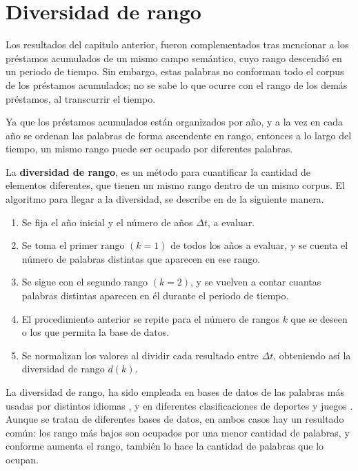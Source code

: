 \chapter{Diversidad de rango}
\label{cap.diversidad}

Los resultados del capitulo anterior, fueron complementados tras mencionar a los préstamos acumulados de un mismo campo semántico, cuyo rango descendió en un periodo de tiempo. Sin embargo, estas palabras no conforman todo el corpus de los préstamos acumulados; no se sabe lo que ocurre con el rango de los demás préstamos, al transcurrir el tiempo. 

Ya que los préstamos acumulados están organizados por año, y a la vez en cada año se ordenan las palabras de forma ascendente en rango, entonces a lo largo del tiempo, un mismo rango puede ser ocupado por diferentes palabras. 

La \textbf{diversidad de rango}, es un método para cuantificar la cantidad de elementos diferentes, que tienen un mismo rango dentro de un mismo corpus. El algoritmo para llegar a la diversidad, se describe en \cite{tesis.sergio} de la siguiente manera.


\begin{enumerate}
		
	\item Se fija el año inicial y el número de años $\Delta t$, a evaluar.
	
	\item Se toma el primer rango $(k=1)$ de todos los años a evaluar, y se cuenta el número de palabras distintas que aparecen en ese rango.  
	
	\item Se sigue con el segundo rango $(k=2)$, y se vuelven a contar cuantas palabras distintas aparecen en él durante el periodo de tiempo. 
	
	\item El procedimiento anterior se repite para el número de rangos $k$ que se deseen o los que permita la base de datos. 
	
	\item Se normalizan los valores al dividir cada resultado entre $\Delta t$, obteniendo así la diversidad de rango $d(k)$.
	
\end{enumerate}

La diversidad de rango, ha sido empleada en bases de datos de las palabras más usadas por distintos idiomas \cite{iplosone}, y en diferentes clasificaciones de deportes y juegos \cite{epj}. Aunque se tratan de diferentes bases de datos, en ambos casos hay un resultado común: los rango más bajos son ocupados por una menor cantidad de palabras, y conforme aumenta el rango, también lo hace la cantidad de palabras que lo ocupan.

